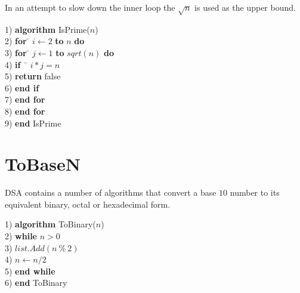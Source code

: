 \documentclass[10pt,oneside,a4paper]{report}
\begin{document}
In an attempt to slow down the inner loop the $\sqrt{n}$ is used as the upper bound.
\begin{tabbing}
1) \textbf{alg}\= \textbf{orithm} IsPrime($n$)\\
2) \> \textbf{for} \= $i \leftarrow 2$ \textbf{to} $n$ \textbf{do}\\
3) \> \> \textbf{for} \= $j \leftarrow 1$ \textbf{to} $sqrt(n)$ \textbf{do}\\
4) \> \> \> \textbf{if} ~\= $i * j = n$\\
5) \> \> \> \> \textbf{return} false\\
6) \> \> \> \textbf{end if}\\
7) \> \> \textbf{end for}\\	
8) \> \textbf{end for}\\
9) \textbf{end} IsPrime
\end{tabbing}

\section{ToBaseN}
DSA contains a number of algorithms that convert a base $10$ number to its equivalent binary, octal or hexadecimal form.

\begin{tabbing}
1) \textbf{alg}\= \textbf{orithm} ToBinary($n$)\\
2) \> \textbf{whi}\= \textbf{le} $n > 0$\\
3) \> \> $list.Add(n~\%~2)$\\
4) \> \> $n \leftarrow n / 2$\\
5) \> \textbf{end while}\\
6) \textbf{end} ToBinary\\
\end{tabbing}
\end{document}
